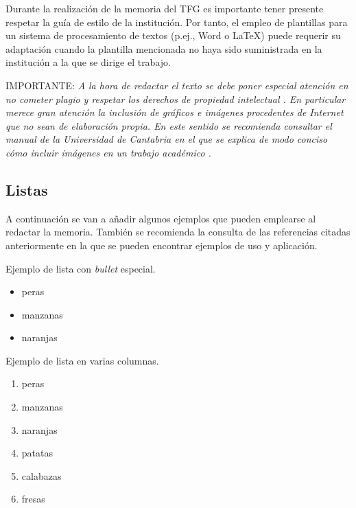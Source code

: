 Durante la realización de la memoria del TFG es importante tener presente respetar la guía de estilo de la institución. Por tanto, el empleo de plantillas para un sistema de procesamiento de textos (p.ej., Word o \LaTeX) puede requerir su adaptación cuando la plantilla mencionada no haya sido suministrada en la institución a la que se dirige el trabajo.

\noindent \textsc{IMPORTANTE}: \emph{A la hora de redactar el texto se debe poner especial atención en no cometer plagio y respetar los derechos de propiedad intelectual \cite{uc3m21}. En particular merece gran atención la inclusión de gráficos e imágenes procedentes de Internet que no sean de elaboración propia. En este sentido se recomienda consultar el manual de la Universidad de Cantabria en el que se explica de modo conciso cómo incluir imágenes en un trabajo académico \cite{unican18}.}

\subsection{Listas}
\label{sec:ejListas}
A continuación se van a añadir algunos ejemplos que pueden emplearse al redactar la memoria. También se recomienda la consulta de las referencias citadas anteriormente en la que se pueden encontrar ejemplos de uso y aplicación.


\noindent Ejemplo de lista con \emph{bullet} especial. 
\begin{itemize}
	\item[\ding{52}] peras
	\item manzanas
	\item naranjas
\end{itemize}


\noindent Ejemplo de lista en varias columnas.
\begin{multicols}{2} %
	\begin{enumerate}
		\item peras
		\item manzanas
		\item naranjas
		\item patatas
		\item calabazas
		\item fresas
	\end{enumerate}
\end{multicols}





